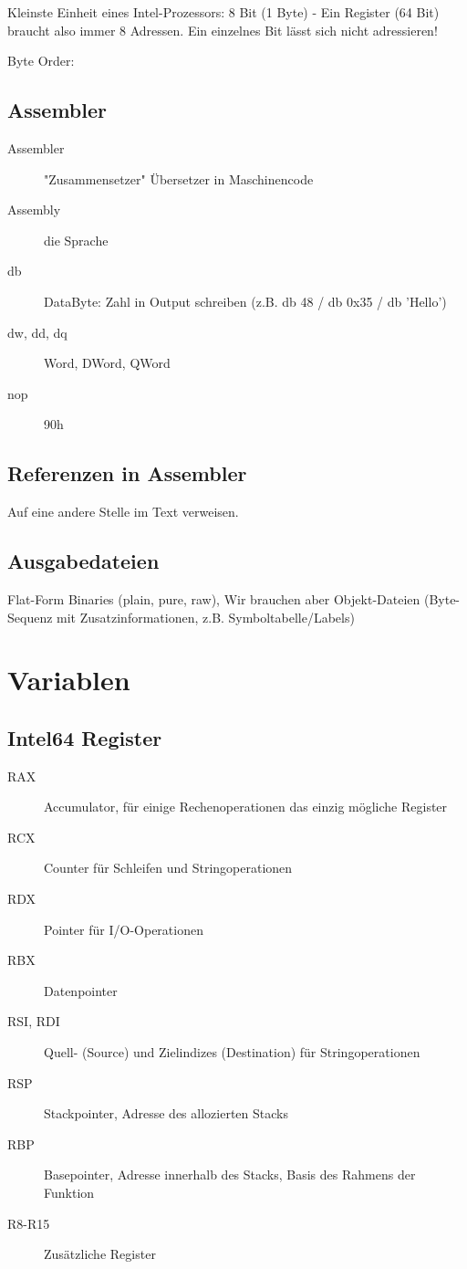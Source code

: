 \begin{multicols*}{4}
    Kleinste Einheit eines Intel-Prozessors: 8 Bit (1 Byte) - Ein Register (64 Bit) braucht also immer 8 Adressen. Ein einzelnes Bit lässt sich nicht adressieren!

    Byte Order:

    \subsection{Assembler}
    \begin{description}
        \item[Assembler] "Zusammensetzer" Übersetzer in Maschinencode
        \item[Assembly] die Sprache
        \item[db] DataByte: Zahl in Output schreiben (z.B. db 48 / db 0x35 / db 'Hello')
        \item[dw, dd, dq] Word, DWord, QWord
        \item[nop] 90h
    \end{description}

    \subsection{Referenzen in Assembler}
    Auf eine andere Stelle im Text verweisen.

    \subsection{Ausgabedateien}
    Flat-Form Binaries (plain, pure, raw), Wir brauchen aber Objekt-Dateien (Byte-Sequenz mit Zusatzinformationen, z.B. Symboltabelle/Labels)

    \section{Variablen}
    \subsection{Intel64 Register}
    \begin{description}
        \item[RAX] Accumulator, für einige Rechenoperationen das einzig mögliche Register
        \item[RCX] Counter für Schleifen und Stringoperationen
        \item[RDX] Pointer für I/O-Operationen
        \item[RBX] Datenpointer
        \item[RSI, RDI] Quell- (Source) und Zielindizes (Destination) für Stringoperationen
        \item[RSP] Stackpointer, Adresse des allozierten Stacks
        \item[RBP] Basepointer, Adresse innerhalb des Stacks, Basis des Rahmens der Funktion
        \item[R8-R15] Zusätzliche Register
    \end{description}


\end{multicols*}
